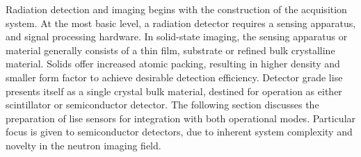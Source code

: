 \documentclass[../../../main.tex]{subfiles}%
\begin{document}
%
    \Xsubsection%
    Radiation detection and imaging begins with the construction of the acquisition system.
    At the most basic level, a radiation detector requires a sensing apparatus, and signal processing hardware.
    In \gls{solid-state} imaging, the sensing apparatus or material generally consists of a thin film, substrate or refined bulk crystalline material.
    Solids offer increased atomic packing, resulting in higher density and smaller form factor to achieve desirable detection efficiency.
    Detector grade \gls{lise} presents itself as a single crystal bulk material, destined for operation as either scintillator or semiconductor detector.
    The following section discusses the preparation of \gls{lise} sensors for integration with both operational modes.
    Particular focus is given to semiconductor detectors, due to inherent system complexity and novelty in the neutron imaging field.
\end{document}
